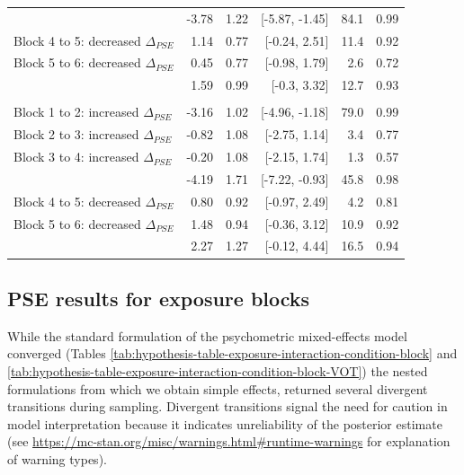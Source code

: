 \documentclass[
  11pt,
  man,mask,floatsintext]{apa6}
\begin{document}
\begin{table}[H]
\begin{tabular}[t]{>{\raggedright\arraybackslash}p{15em}rrrrr}
\hspace{1em}{\em Block 1 to 4: increased $\Delta_{PSE}$} & -3.78 & 1.22 & {}[-5.87, -1.45] & 84.1 & 0.99\\
\hspace{1em}Block 4 to 5: decreased $\Delta_{PSE}$ & 1.14 & 0.77 & {}[-0.24, 2.51] & 11.4 & 0.92\\
\hspace{1em}Block 5 to 6: decreased $\Delta_{PSE}$ & 0.45 & 0.77 & {}[-0.98, 1.79] & 2.6 & 0.72\\
\hspace{1em}{\em Block 4 to 6: decreased $\Delta_{PSE}$} & 1.59 & 0.99 & {}[-0.3, 3.32] & 12.7 & 0.93\\
\addlinespace[0.3em]
\multicolumn{6}{l}{\textbf{Difference in +40 vs. baseline}}\\
\hspace{1em}Block 1 to 2: increased $\Delta_{PSE}$ & -3.16 & 1.02 & {}[-4.96, -1.18] & 79.0 & 0.99\\
\hspace{1em}Block 2 to 3: increased $\Delta_{PSE}$ & -0.82 & 1.08 & {}[-2.75, 1.14] & 3.4 & 0.77\\
\hspace{1em}Block 3 to 4: increased $\Delta_{PSE}$ & -0.20 & 1.08 & {}[-2.15, 1.74] & 1.3 & 0.57\\
\hspace{1em}{\em Block 1 to 4: increased $\Delta_{PSE}$} & -4.19 & 1.71 & {}[-7.22, -0.93] & 45.8 & 0.98\\
\hspace{1em}Block 4 to 5: decreased $\Delta_{PSE}$ & 0.80 & 0.92 & {}[-0.97, 2.49] & 4.2 & 0.81\\
\hspace{1em}Block 5 to 6: decreased $\Delta_{PSE}$ & 1.48 & 0.94 & {}[-0.36, 3.12] & 10.9 & 0.92\\
\hspace{1em}{\em Block 4 to 6: decreased $\Delta_{PSE}$} & 2.27 & 1.27 & {}[-0.12, 4.44] & 16.5 & 0.94\\
\bottomrule
\end{tabular}
\end{table}

\subsection{PSE results for exposure blocks}\label{sec:SI-exposure-block-analysis}

While the standard formulation of the psychometric mixed-effects model converged (Tables \ref{tab:hypothesis-table-exposure-interaction-condition-block} and \ref{tab:hypothesis-table-exposure-interaction-condition-block-VOT}) the nested formulations from which we obtain simple effects, returned several divergent transitions during sampling. Divergent transitions signal the need for caution in model interpretation because it indicates unreliability of the posterior estimate (see \url{https://mc-stan.org/misc/warnings.html\#runtime-warnings} for explanation of warning types).
\end{document}
